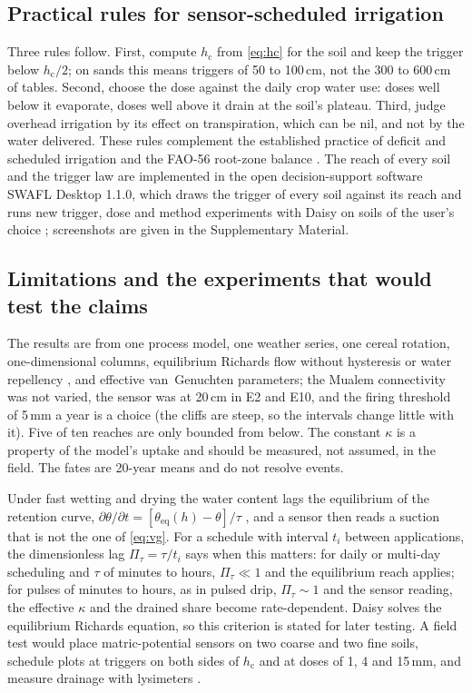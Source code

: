 \documentclass[review,12pt,authoryear]{elsarticle}
\newcommand{\hc}{h_{\mathrm{c}}}
\begin{document}
\subsection{Practical rules for sensor-scheduled irrigation}
Three rules follow. First, compute $\hc$ from \cref{eq:hc} for the soil and keep the trigger below $\hc/2$; on sands this means triggers of 50 to 100\,cm, not the 300 to 600\,cm of tables. Second, choose the dose against the daily crop water use: doses well below it evaporate, doses well above it drain at the soil's plateau. Third, judge overhead irrigation by its effect on transpiration, which can be nil, and not by the water delivered. These rules complement the established practice of deficit and scheduled irrigation \citep{Fereres2007,Geerts2009,Pereira2012} and the FAO-56 root-zone balance \citep{Allen1998}. The reach of every soil and the trigger law are implemented in the open decision-support software SWAFL Desktop 1.1.0, which draws the trigger of every soil against its reach and runs new trigger, dose and method experiments with Daisy on soils of the user's choice \citep{HaliluManual}; screenshots are given in the Supplementary Material.

\subsection{Limitations and the experiments that would test the claims}
The results are from one process model, one weather series, one cereal rotation, one-dimensional columns, equilibrium Richards flow without hysteresis or water repellency \citep{Elmaloglou2009b,Diamantopoulos2013AWR,Diamantopoulos2013JH}, and effective van~Genuchten parameters; the Mualem connectivity was not varied, the sensor was at 20\,cm in E2 and E10, and the firing threshold of 5\,mm a year is a choice (the cliffs are steep, so the intervals change little with it). Five of ten reaches are only bounded from below. The constant $\kappa$ is a property of the model's uptake and should be measured, not assumed, in the field. The fates are 20-year means and do not resolve events.

Under fast wetting and drying the water content lags the equilibrium of the retention curve, $\partial\theta/\partial t=[\theta_{\mathrm{eq}}(h)-\theta]/\tau$ \citep{RossSmettem2000,Hassanizadeh2002,Diamantopoulos2012VZJ,Diamantopoulos2012WRR}, and a sensor then reads a suction that is not the one of \cref{eq:vg}. For a schedule with interval $t_i$ between applications, the dimensionless lag $\Pi_\tau=\tau/t_i$ says when this matters: for daily or multi-day scheduling and $\tau$ of minutes to hours, $\Pi_\tau\ll1$ and the equilibrium reach applies; for pulses of minutes to hours, as in pulsed drip, $\Pi_\tau\sim1$ and the sensor reading, the effective $\kappa$ and the drained share become rate-dependent. Daisy solves the equilibrium Richards equation, so this criterion is stated for later testing. A field test would place matric-potential sensors on two coarse and two fine soils, schedule plots at triggers on both sides of $\hc$ and at doses of 1, 4 and 15\,mm, and measure drainage with lysimeters \citep{Groh2020}.
\end{document}
